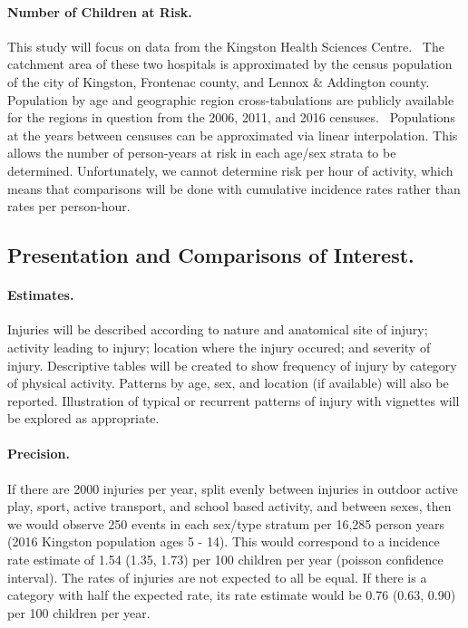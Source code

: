 \documentclass [11pt]{article}
\begin{document}
\paragraph{Number of Children at Risk.} This study will focus on data from the Kingston Health Sciences Centre.~\cite{Pickett2003-zj} The catchment area of these two hospitals is approximated by the census population of the city of Kingston, Frontenac county, and Lennox \& Addington county.~\cite{Pickett2003-zj} Population by age and geographic region cross-tabulations are publicly available for the regions in question from the 2006, 2011, and 2016 censuses.~\cite{Government_of_Canada2007-zb,Government_of_Canada2017-iu} Populations at the years between censuses can be approximated via linear interpolation. This allows the number of person-years at risk in each age/sex strata to be determined. Unfortunately, we cannot determine risk per hour of activity, which means that comparisons will be done with cumulative incidence rates rather than rates per person-hour. 

\subsection{Presentation and Comparisons of Interest.} 

\paragraph{Estimates.} Injuries will be described according to nature and anatomical site of injury; activity leading to injury; location where the injury occured; and severity of injury. Descriptive tables will be created to show frequency of injury by category of physical activity. Patterns by age, sex, and location (if available) will also be reported. Illustration of typical or recurrent patterns of injury with vignettes will be explored as appropriate.~\cite{Pickett2003-zj}

\paragraph{Precision.} If there are 2000 injuries per year, split evenly between injuries in outdoor active play, sport, active transport, and school based activity, and between sexes, then we would observe 250 events in each sex/type stratum per 16,285 person years (2016 Kingston population ages 5 - 14). This would correspond to a incidence rate estimate of 1.54 (1.35, 1.73) per 100 children per year (poisson confidence interval). The rates of injuries are not expected to all be equal. If there is a category with half the expected rate, its rate estimate would be 0.76 (0.63, 0.90) per 100 children per year. 
\end{document}
